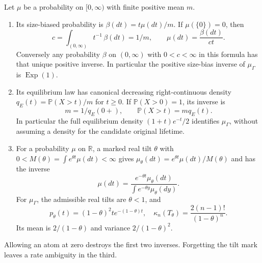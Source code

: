 \begin{proposition}
\label{final:P5-transforms}
Let $\mu$ be a probability on $[0,\infty)$ with finite positive
mean $m$.
\begin{enumerate}
\item Its size-biased probability is $\beta(dt)=t\mu(dt)/m$.
      If $\mu(\{0\})=0$, then
      \[
      c=\int_{(0,\infty)}t^{-1}\,\beta(dt)=1/m,
      \qquad \mu(dt)=\frac{\beta(dt)}{ct}.
      \]
      Conversely any probability $\beta$ on $(0,\infty)$ with
      $0<c<\infty$ in this formula has that unique positive inverse.
      In particular the positive size-bias inverse of
      $\mu_\Gamma$ is $\operatorname{Exp}(1)$.
\item Its equilibrium law has canonical decreasing right-continuous
      density $q_E(t)=\mathbb P(X>t)/m$ for $t\geq0$.
      If $\mathbb P(X>0)=1$, its inverse is
      \[
      m=1/q_E(0+),\qquad\mathbb P(X>t)=m q_E(t).
      \]
      In particular the full equilibrium density
      $(1+t)e^{-t}/2$ identifies $\mu_\Gamma$, without assuming a
      density for the candidate original lifetime.
\item For a probability $\mu$ on $\mathbb R$, a marked real tilt
      $\theta$ with $0<M(\theta)=\int e^{\theta t}\mu(dt)<\infty$
      gives $\mu_\theta(dt)=e^{\theta t}\mu(dt)/M(\theta)$ and has
      the inverse
      \[
      \mu(dt)=\frac{e^{-\theta t}\mu_\theta(dt)}
                    {\int e^{-\theta y}\mu_\theta(dy)}.
      \]
      For $\mu_\Gamma$, the admissible real tilts are $\theta<1$,
      and
      \[
      p_\theta(t)=(1-\theta)^2t e^{-(1-\theta)t},\quad
      \kappa_n(T_\theta)=\frac{2(n-1)!}{(1-\theta)^n}.
      \]
      Its mean is $2/(1-\theta)$ and variance
      $2/(1-\theta)^2$.
\end{enumerate}
Allowing an atom at zero destroys the first two inverses.  Forgetting
the tilt mark leaves a rate ambiguity in the third.
\end{proposition}
